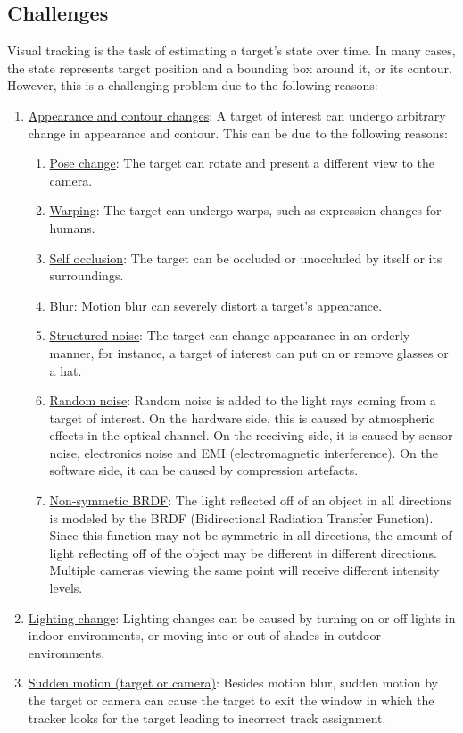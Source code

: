 \subsection{Challenges}
Visual tracking is the task of estimating a target's state over time.  In many cases, the state represents target position and a bounding box around it, or its contour.  However, this is a challenging problem due to the following reasons:

\begin{enumerate}
\item \underline{Appearance and contour changes}:  A target of interest can undergo arbitrary change in appearance and contour.  This can be due to the following reasons:
\begin{enumerate}
\item \underline{Pose change}:  The target can rotate and present a different view to the camera.
\item \underline{Warping}: The target can undergo warps, such as expression changes for humans.
\item \underline{Self occlusion}:  The target can be occluded or unoccluded by itself or its surroundings.
\item \underline{Blur}:  Motion blur can severely distort a target's appearance.
\item \underline{Structured noise}:  The target can change appearance in an orderly manner, for instance, a target of interest can put on or remove glasses or a hat.
\item \underline{Random noise}:  Random noise is added to the light rays coming from a target of interest.  On the hardware side, this is caused by atmospheric effects in the optical channel.  On the receiving side, it is caused by sensor noise, electronics noise and EMI (electromagnetic interference).  On the software side, it can be caused by compression artefacts.
\item \underline{Non-symmetic BRDF}:  The light reflected off of an object in all directions is modeled by the BRDF (Bidirectional Radiation Transfer Function).  Since this function may not be symmetric in all directions, the amount of light reflecting off of the object may be different in different directions.  Multiple cameras viewing the same point will receive different intensity levels.
\end{enumerate}
\item \underline{Lighting change}: Lighting changes can be caused by turning on or off lights in indoor environments, or moving into or out of shades in outdoor environments.
\item \underline{Sudden motion (target or camera)}:  Besides motion blur, sudden motion by the target or camera can cause the target to exit the window in which the tracker looks for the target leading to incorrect track assignment.
\end{enumerate}

